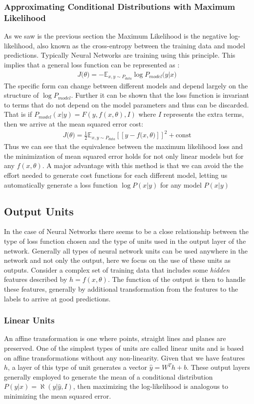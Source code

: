 \documentclass[14pt]{extarticle}
\numberwithin{equation}{section}
\begin{document}
		\subsubsection{Approximating Conditional Distributions with Maximum Likelihood}
		As we saw is the previous section the Maximum Likelihood is the negative log-likelihood, also known as the cross-entropy between the training data and model predictions. Typically Neural Networks are training using this principle. This implies that a general loss function can be represented as :
		\begin{align}
		 J\big(\theta\big) = -\mathbb{E}_{x,{y \sim P_{data}}}\log P_{model}\big(y|x\big)
		\end{align}
		The specific form can change between different models and depend largely on the structure of $\log P_{model}$. Further it can be shown that the loss function is invariant to terms that do not depend on the model parameters and thus can be discarded. That is if $P_{model}(x | y) = F(y, f(x,\theta), I)$ where $I$ represents the extra terms, then we arrive at the mean squared error cost:
		\begin{align}
		J\big(\theta\big) = \frac{1}{2} \mathbb{E}_{x,{y \sim P_{data}}} [\![y - f\big(x, \theta\big)]\!]^2 + \text{const} \label{eq:mse_loss}
		\end{align}
		Thus we can see that the equivalence between the maximum likelihood loss and the minimization of mean squared error holds for not only linear models but for any $f(x,\theta)$. A major advantage with this method is that we can avoid the the effort needed to generate cost functions for each different model, letting us automatically generate a loss function $\log P(x | y)$ for any model $P(x | y)$
		\subsection{Output Units}
		In the case of Neural Networks there seems to be a close relationship between the type of loss function chosen and the type of units used in the output layer of the network. Generally all types of neural network units can be used anywhere in the network and not only the output, here we focus on the use of these units as outputs. Consider a complex set of training data that includes some \textit{hidden} features described by $h = f(x,\theta)$. The function of the output is then to handle these features, generally by additional transformation from the features to the labels to arrive at good predictions.
		\subsubsection{Linear Units}\label{linear_unit}
		An affine transformation is one where points, straight lines and planes are preserved. One of the simplest types of units are called linear units and is based on affine transformations without any non-linearity. Given that we have features $h$, a layer of this type of unit generates a vector $\hat{y} = W^T h + b$. These output layers generally employed to generate the mean of a conditional distribution $P(y | x) = \aleph(y | \hat{y}, I)$, then maximizing the log-likelihood is analogous to minimizing the mean squared error.
\end{document}
